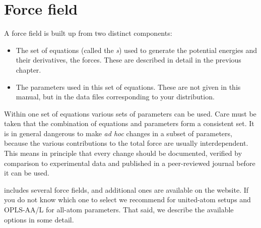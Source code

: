 %
%
%



\section{Force field}
\label{sec:ff}
A force field is built up from two distinct components:
\begin{itemize}
\item The set of equations (called the {\em
    s}) used to generate the potential
  energies and their derivatives, the forces. These are described in
  detail in the previous chapter.
\item The parameters used in this set of equations. These are not
  given in this manual, but in the data files corresponding to your
  {\gromacs} distribution.
\end{itemize}
Within one set of equations various sets of parameters can be
used. Care must be taken that the combination of equations and
parameters form a consistent set. It is in general dangerous to make
{\em ad hoc} changes in a subset of parameters, because the various
contributions to the total force are usually interdependent. This
means in principle that every change should be documented, verified by
comparison to experimental data and published in a peer-reviewed
journal before it can be used.

{\gromacs} {\gmxver} includes several force fields, and additional
ones are available on the website. If you do not know which one to
select we recommend  for united-atom setups and OPLS-AA/L for
all-atom parameters. That said, we describe the available options in
some detail.

